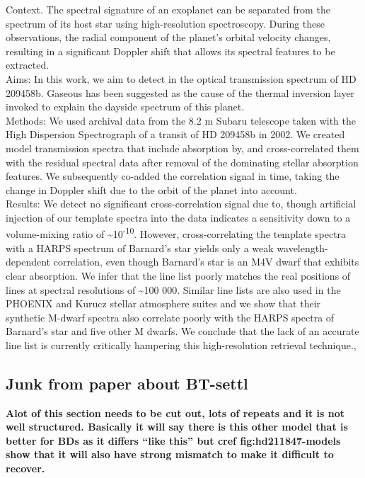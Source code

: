 \citet{hoeijmakers_search_2015}
{Context.
The spectral signature of an exoplanet can be separated from the spectrum of its host star using high-resolution spectroscopy.
During these observations, the radial component of the planet's orbital velocity changes, resulting in a significant Doppler shift that allows its spectral features to be extracted. \\
     Aims: In this work, we aim to detect in the optical transmission spectrum of HD 209458b.
Gaseous has been suggested as the cause of the thermal inversion layer invoked to explain the dayside spectrum of this planet. \\
     Methods: We used archival data from the 8.2 m Subaru telescope taken with the High Dispersion Spectrograph of a transit of HD 209458b in 2002.
We created model transmission spectra that include absorption by, and cross-correlated them with the residual spectral data after removal of the dominating stellar absorption features.
We subsequently co-added the correlation signal in time, taking the change in Doppler shift due to the orbit of the planet into account. \\
     Results: We detect no significant cross-correlation signal due to, though artificial injection of our template spectra into the data indicates a sensitivity down to a volume-mixing ratio of \textasciitilde{}10\textsuperscript{-10}.
However, cross-correlating the template spectra with a HARPS spectrum of Barnard's star yields only a weak wavelength-dependent correlation, even though Barnard's star is an M4V dwarf that exhibits clear  absorption.
We infer that the line list poorly matches the real positions of lines at spectral resolutions of \textasciitilde{}100 000.
Similar line lists are also used in the {PHOENIX} and Kurucz stellar atmosphere suites and we show that their synthetic M-dwarf spectra also correlate poorly with the HARPS spectra of Barnard's star and five other M dwarfs.
We conclude that the lack of an accurate line list is currently critically hampering this high-resolution retrieval technique.},




\subsection{Junk from paper about BT-settl}


\textbf{Alot of this section needs to be cut out, lots of repeats and it is not well structured.
Basically it will say there is this other model that is better for BDs as it differs ``like this'' but \textbf{cref {fig:hd211847-models}} show that it will also have strong mismatch to make it difficult to recover.}

